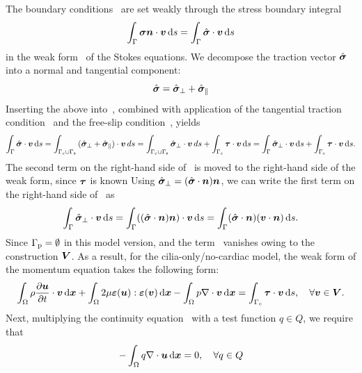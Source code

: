 \documentclass{WileyMSP-template}
\begin{document}
The boundary conditions~ are set weakly through the stress
boundary integral 
\begin{equation}
    \int_{\Gamma}\bm{\sigma}\bm{n}\cdot\bm{v} \, \mathrm ds =  \int_{\Gamma}\hat{\bm{\sigma}}\cdot\bm{v} \, \mathrm ds
    \label{eq:boundary_integral_BC1}
\end{equation}
in the weak form~ of the Stokes equations.
We decompose the traction vector $\hat{\bm{\sigma}}$ into a normal and tangential component:
\begin{equation*}
    \hat{\bm{\sigma}} = \hat{\bm{\sigma}}_{\perp} + \hat{\bm{\sigma}}_{\parallel}
\end{equation*}
Inserting the above into~,
combined with application of the tangential traction
condition~ and the
free-slip condition~, yields
\begin{equation}
    \int_{\Gamma}\hat{\bm{\sigma}}\cdot\bm{v} \, \mathrm ds = \int_{\Gamma_{\mathrm{c}}\cup\Gamma_{\mathrm{s}}}{(\hat{\bm{\sigma}}_{\perp} + \hat{\bm{\sigma}}_{\parallel})\cdot\bm{v}}\, ds = 
    \int_{\Gamma_{\mathrm{c}}\cup\Gamma_{\mathrm{s}}}{\hat{\bm{\sigma}}_{\perp}\cdot\bm{v}}\, ds
    + \int_{\Gamma_{\mathrm{c}}}\bm{\tau}\cdot\bm{v} \, \mathrm ds = \int_{\Gamma}\hat{\bm{\sigma}}_{\perp}\cdot\bm{v} \, \mathrm ds + \int_{\Gamma_{\mathrm{c}}}\bm{\tau}\cdot\bm{v} \, \mathrm ds.
    \label{eq:boundary_integral_BC2}
\end{equation}
The second term on the right-hand side of~
is moved to the right-hand side of the weak form, since $\bm{\tau}$ is known
 Using $\hat{\bm{\sigma}}_{\perp} = (\hat{\bm{\sigma}}\cdot\bm{n})\bm{n}$,
 we can write the first term on the right-hand side of~ as
\begin{equation}
    \int_{\Gamma}\hat{\bm{\sigma}}_{\perp}\cdot\bm{v} \, \mathrm ds = \int_{\Gamma}((\hat{\bm{\sigma}}\cdot\bm{n})\bm{n})\cdot\bm{v} \, \mathrm ds =
    \int_{\Gamma}(\hat{\bm{\sigma}}\cdot\bm{n})(\bm{v}\cdot\bm{n}) \, \mathrm ds.
    \label{eq:boundary_integral_BC_normal}
\end{equation}
Since $\Gamma_{\mathrm{p}}=\emptyset$ in this model version, and the term~
vanishes owing to the construction $\bm{V}$. As a result, for the cilia-only/no-cardiac model,
the weak form of the momentum equation takes the following form:
\begin{equation*}
    \int_{\Omega}\rho\frac{\partial \bm{u}}{\partial t}\cdot\bm{v} \, \mathrm d\bm{x}
    + \int_{\Omega}2\mu\bm{\varepsilon}(\bm{u}) : \bm{\varepsilon}(\bm{v}) \, \mathrm d\bm{x}
    - \int_{\Omega}p\nabla\cdot\bm{v} \, \mathrm d\bm{x} = \int_{\Gamma_{\mathrm{c}}}\bm{\tau}\cdot\bm{v} \, \mathrm ds, \quad\forall\bm{v}\in\bm{V}.
\end{equation*}
Next, multiplying the continuity equation~
with a test function $q\in Q$, we require that
\begin{equation}
    -\int_{\Omega}q\nabla\cdot\bm{u} \, \mathrm d\bm{x} = 0,\quad\forall q\in Q
    \label{eq:pressure_weak_form}
\end{equation}
\end{document}
